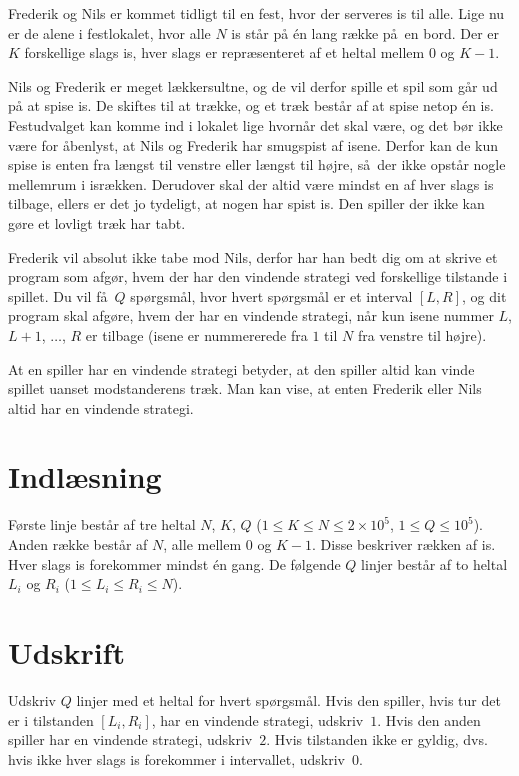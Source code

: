 
Frederik og Nils er kommet tidligt til en fest, hvor der serveres is til alle.
Lige nu er de alene i festlokalet, hvor alle $N$ is står på én lang række på en bord.
Der er $K$ forskellige slags is, hver slags er repræsenteret af et heltal mellem $0$ og $K-1$.


Nils og Frederik er meget lækkersultne, og de vil derfor spille et spil som går ud på at spise is.
De skiftes til at trække, og et træk består af at spise netop én is.
Festudvalget kan komme ind i lokalet lige hvornår det skal være, og det bør ikke være for åbenlyst, at Nils og Frederik har smugspist af isene.
Derfor kan de kun spise is enten fra længst til venstre eller længst til højre, så der ikke opstår nogle mellemrum i isrækken.
Derudover skal der altid være mindst en af hver slags is tilbage, ellers er det jo tydeligt, at nogen har spist is.
Den spiller der ikke kan gøre et lovligt træk har tabt.

Frederik vil absolut ikke tabe mod Nils, derfor har han bedt dig om at skrive et program som afgør, hvem der har den vindende strategi ved forskellige tilstande i spillet.
Du vil få $Q$ spørgsmål, hvor hvert spørgsmål er et interval $[L,R]$, og dit program skal afgøre, hvem der har en vindende strategi, når kun isene nummer $L$, $L+1$, $\dots$, $R$ er tilbage (isene er nummererede fra $1$ til $N$ fra venstre til højre).

At en spiller har en vindende strategi betyder, at den spiller altid kan vinde spillet uanset modstanderens træk.
Man kan vise, at enten Frederik eller Nils altid har en vindende strategi.

\section*{Indlæsning}

Første linje består af tre heltal $N$, $K$, $Q$ ($1 \le K \le N \le 2 \times 10^5$, $1 \le Q \le 10^5$).
Anden række består af $N$, alle mellem $0$ og $K-1$.
Disse beskriver rækken af is.
Hver slags is forekommer mindst én gang.
De følgende $Q$ linjer består af to heltal $L_i$ og $R_i$ ($1 \le L_i \le R_i \le N$).

\section*{Udskrift}

Udskriv $Q$ linjer med et heltal for hvert spørgsmål.
Hvis den spiller, hvis tur det er i tilstanden $[L_i, R_i]$, har en vindende strategi, udskriv~$1$.
Hvis den anden spiller har en vindende strategi, udskriv~$2$.
Hvis tilstanden ikke er gyldig, dvs. hvis ikke hver slags is forekommer i intervallet, udskriv~$0$.

